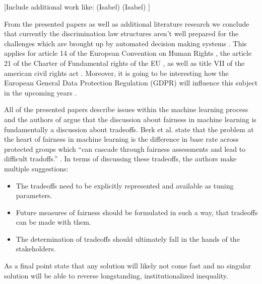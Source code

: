 [Include additional work like: \cite{isabel01} (Isabel) \cite{isabel02} (Isabel) \cite{Singh} \cite{automatedDsicrimination}]

From the presented papers as well as additional literature research we conclude that currently the discrimination law structures aren't well prepared for the challenges which are brought up by automated decision making systems \cite{Barocas.2016, barocas-hardt-narayanan, automatedDsicrimination}. This applies for article 14 of the European Convention on Human Rights \cite{EU14}, the article 21 of the Charter of Fundamental rights of the EU \cite{EU21}, as well as title VII \cite{titleVII} of the american civil rights act  \cite{Barocas.2016, automatedDsicrimination}. Moreover, it is going to be interesting how the European General Data Protection Regulation (GDPR) will influence this subject in the upcoming years \cite{automatedDsicrimination, Singh}.

All of the presented papers describe issues within the machine learning process and the authors of \cite{ Barocas.2016, Berk.2018} argue that the discussion about fairness in machine learning is fundamentally a discussion about tradeoffs. Berk et al. state that the problem at the heart of fairness in machine learning is the difference
in base rate across protected groups which \enquote{can cascade through fairness assessments
and lead to difficult tradoffs.} \cite{Berk.2018}. In terms of discussing these tradeoffs, the authors make multiple
suggestions:
\begin{itemize}
    \item The tradeoffs need to be explicitly represented and available as tuning parameters.
    \item Future measures of fairness should be formulated in such a way, that tradeoffs can
    be made with them.
    \item The determination of tradeoffs should ultimately fall in the hands of the stakeholders.
\end{itemize}
As a final point \cite{ Barocas.2016, Berk.2018} state that any solution will likely not come fast and no singular
solution will be able to reverse longstanding, institutionalized inequality.